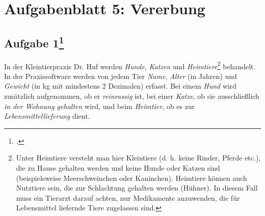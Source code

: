 \documentclass{lehramt-informatik-haupt}
\begin{document}
\chapter{Aufgabenblatt 5: Vererbung}

%

\section{Aufgabe 1\footcite{oomup:ab:5}}

In der Kleintierpraxis Dr. Huf werden \emph{Hunde}, \emph{Katzen} und
\emph{Heimtiere}\footnote{Unter Heimtiere versteht man hier Kleintiere
(d. h. keine Rinder, Pferde etc.), die zu Hause gehalten werden und
keine Hunde oder Katzen sind (beispielsweise Meerschweinchen oder
Kaninchen). Heimtiere können auch Nutztiere sein, die zur Schlachtung
gehalten werden (\zB Hühner). In diesem Fall muss ein Tierarzt darauf
achten, nur Medikamente anzuwenden, die für Lebensmittel liefernde Tiere
zugelassen sind.} behandelt. In der Praxissoftware werden von jedem Tier
\emph{Name}, \emph{Alter} (in Jahren) und \emph{Gewicht} (in kg mit
mindestens 2 Dezimalen) erfasst. Bei einem \emph{Hund} wird zusätzlich
aufgenommen, ob er \emph{reinrassig} ist, bei einer \emph{Katze}, ob sie
ausschließlich \emph{in der Wohnung gehalten} wird, und beim
\emph{Heimtier}, ob es zur \emph{Lebensmittellieferung} dient.
\end{document}
